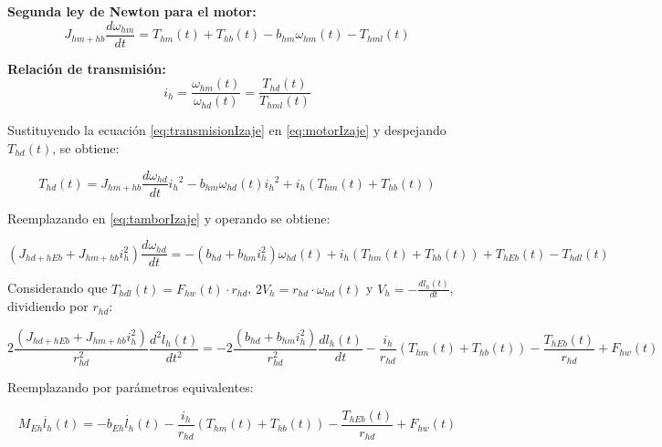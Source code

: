 \documentclass{article}
\begin{document}
            \textbf{Segunda ley de Newton para el motor:}
            \begin{equation} \label{eq:motorIzaje}
                J_{hm+hb} \frac{d \omega_{hm}}{dt} = T_{hm}(t) + T_{hb}(t) - b_{hm} \omega_{hm}(t) - T_{hml}(t)
            \end{equation}

            \textbf{Relación de transmisión:}
            \begin{equation} \label{eq:transmisionIzaje}
                i_h = \frac{\omega_{hm}(t)}{\omega_{hd}(t)} = \frac{T_{hd}(t)}{T_{hml}(t)}
            \end{equation}

            Sustituyendo la ecuación \ref{eq:transmisionIzaje} en \ref{eq:motorIzaje} y despejando $T_{hd}(t)$, se obtiene:

            \begin{equation} \label{eq:Thd}
                T_{hd}(t) = J_{hm+hb} \frac{d \omega_{hd}}{dt} {i_h}^2 - b_{hm} \omega_{hd}(t) {i_h}^2 + i_h (T_{hm}(t) + T_{hb}(t))
            \end{equation}

            Reemplazando en \ref{eq:tamborIzaje} y operando se obtiene:

            \begin{equation} \label{eq:izajeThdl}
                (J_{hd+hEb} + J_{hm+hb} i_h^2) \frac{d \omega_{hd}}{dt} = - (b_{hd} + b_{hm} i_h^2) \omega_{hd}(t) + i_h (T_{hm}(t) + T_{hb}(t)) + T_{hEb}(t) - T_{hdl}(t)
            \end{equation}

            Considerando que $T_{hdl}(t) = F_{hw}(t) \cdot r_{hd}$, $2V_h = r_{hd} \cdot \omega_{hd}(t)$ y $V_h = -\frac{d l_h(t)}{dt}$, dividiendo por $r_{hd}$:

            \begin{equation} \label{eq:izajeFhw}
                2\frac{(J_{hd+hEb} + J_{hm+hb} i_h^2)}{r_{hd}^2} \frac{d^2 l_h(t)}{dt^2} = - 2\frac{(b_{hd} + b_{hm} i_h^2)}{r_{hd}^2} \frac{d l_h(t)}{dt} - \frac{i_h}{r_{hd}} (T_{hm}(t) + T_{hb}(t)) - \frac{T_{hEb}(t)}{r_{hd}} + F_{hw}(t)
            \end{equation}

            Reemplazando por parámetros equivalentes:

            \begin{equation} \label{eq:izajeEquiv}
                M_{Eh} \ddot{l_h}(t) = - b_{Eh} \dot{l_h}(t) - \frac{i_h}{r_{hd}} (T_{hm}(t) + T_{hb}(t)) - \frac{T_{hEb}(t)}{r_{hd}} + F_{hw}(t)
            \end{equation}
\end{document}
